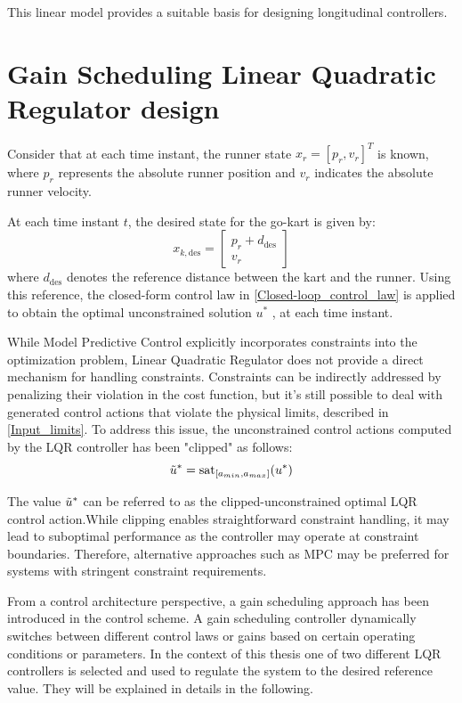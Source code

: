 \documentclass[a4paper,12pt,oneside]{book}
\begin{document}
This linear model provides a suitable basis for designing longitudinal controllers.


\section{Gain Scheduling Linear Quadratic Regulator design}
Consider that at each time instant, the runner state $x_r =[p_r , v_r] ^T $ is known, where $p_r$ represents the absolute runner position and $v_r$ indicates the absolute runner velocity.

At each time instant $t$, the desired state for the go-kart is given by:
\begin{equation}
    x_{k,\text{des}} =
    \begin{bmatrix}
        p_r + d_{\text{des}} \\
        v_r
    \end{bmatrix}
\end{equation}
where $d_{\text{des}}$ denotes the reference distance between the kart and the runner.
Using this reference, the closed-form control law in \ref{Closed-loop_control_law} is applied to obtain the optimal unconstrained solution $u^*$ , at each time instant.

\bigskip
While Model Predictive Control explicitly incorporates constraints into the optimization problem, Linear Quadratic Regulator does not provide a direct mechanism for handling constraints.
Constraints can be indirectly addressed by penalizing their violation in the cost function, but it's still possible to deal with generated control actions that violate the physical limits, described in \ref{Input_limits}.
To address this issue, the unconstrained control actions computed by the LQR controller has been "clipped" as follows:
\begin{equation}
    \Tilde{u}^* = \text{sat}_{[a_{min}, a_{max}]} (u^*)
\end{equation}

The value $\Tilde{u}^*$ can be referred to as the clipped-unconstrained optimal LQR control action.While clipping enables straightforward constraint handling, it may lead to suboptimal performance as the controller may operate at constraint boundaries. 
Therefore, alternative approaches such as MPC may be preferred for systems with stringent constraint requirements.

\bigskip
From a control architecture perspective, a gain scheduling approach has been introduced in the control scheme.
A gain scheduling controller dynamically switches between different control laws or gains based on certain operating conditions or parameters.
In the context of this thesis one of two different LQR controllers is selected and used to regulate the system to the desired reference value.
They will be explained in details in the following.
\end{document}
